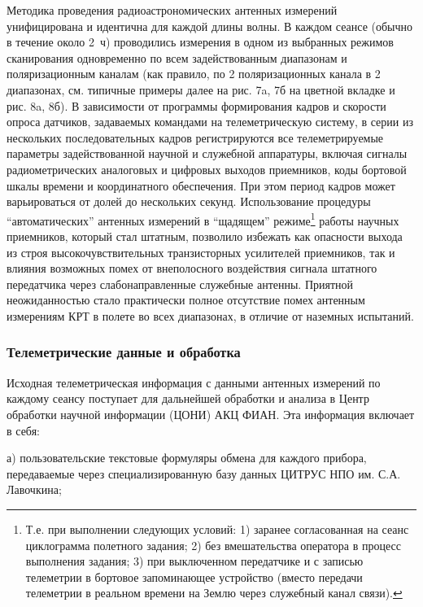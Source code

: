 Методика проведения радиоастрономических антенных измерений унифицирована и
идентична для каждой длины волны. В каждом сеансе (обычно в течение около 2~ч)
проводились измерения в одном из выбранных режимов сканирования
одновременно по всем задействованным диапазонам и поляризационным каналам
(как правило, по 2 поляризационных канала в 2 диапазонах,
см. типичные примеры далее на рис. 7a, 7б на цветной вкладке и   рис. 8a, 8б).
В зависимости от программы формирования кадров и скорости
опроса датчиков, задаваемых командами на телеметрическую систему,
в серии из нескольких последовательных кадров регистрируются все
телеметрируемые параметры задействованной научной и служебной аппаратуры,
включая сигналы радиометрических аналоговых и цифровых выходов приемников,
коды бортовой шкалы
времени и координатного обеспечения. При этом период кадров может
варьироваться от долей до нескольких секунд.
Использование процедуры ``автоматических'' антенных измерений
в ``щадящем'' режиме\footnote
{
Т.е. при выполнении следующих условий:
1) заранее согласованная на сеанс циклограмма полетного задания;
2) без вмешательства оператора в процесс выполнения задания;
3) при выключенном передатчике и с записью телеметрии в бортовое
запоминающее устройство (вместо передачи телеметрии в реальном
времени на Землю через служебный канал связи).
}
работы научных приемников, который стал штатным,
позволило избежать как опасности выхода из строя
высокочувствительных транзисторных усилителей приемников,
так и влияния возможных помех от внеполосного воздействия
сигнала штатного передатчика через слабонаправленные служебные антенны.
Приятной неожиданностью стало практически полное отсутствие помех
антенным измерениям КРТ в полете во всех диапазонах, в отличие от
наземных испытаний.


\subsubsection{Телеметрические данные и обработка}


Исходная телеметрическая информация с данными антенных измерений по
каждому сеансу поступает для дальнейшей обработки и анализа в
Центр обработки научной информации (ЦОНИ) АКЦ ФИАН. Эта информация
включает в себя:

а) пользовательские текстовые формуляры обмена
для каждого прибора, передаваемые через специализированную базу данных
ЦИТРУС НПО им. С.А. Лавочкина;

